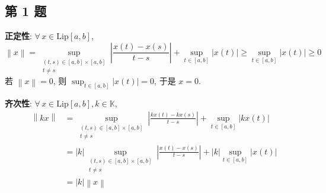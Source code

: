 \documentclass[\ROOT/main.tex]{subfiles}
\begin{document}
\subsection{第 1 题}
\noindent\textbf{正定性}:
$\forall \, x \in \mathrm{Lip} [a, b]$,
\[
    \left\| x \right\|
    =
    \sup_{\substack{\left( t, s \right) \in [a, b] \times [a, b] \\ t \neq s}} \left| \frac{x \left( t \right) - x \left( s \right)}{t - s} \right| + \sup_{t \in [a, b]} \left| x \left( t \right) \right|
    \geqslant
    \sup_{t \in [a, b]} \left| x \left( t \right) \right|
    \geqslant
    0
\]
若 $\left\| x \right\| = 0$, 则 $\sup_{t \in [a, b]} \left| x \left( t \right) \right| = 0$, 于是 $x = 0$.

\noindent\textbf{齐次性}:
$\forall \, x \in \mathrm{Lip} [a, b], k \in \mathbb{K}$,
\begin{align*}
    \left\| k x \right\|
    &=
    \sup_{\substack{\left( t, s \right) \in [a, b] \times [a, b] \\ t \neq s}} \left| \frac{k x \left( t \right) - k x \left( s \right)}{t - s} \right| + \sup_{t \in [a, b]} \left| k x \left( t \right) \right| \\
    &=
    \left| k \right| \sup_{\substack{\left( t, s \right) \in [a, b] \times [a, b] \\ t \neq s}} \left| \frac{x \left( t \right) - x \left( s \right)}{t - s} \right| + \left| k \right| \sup_{t \in [a, b]} \left| x \left( t \right) \right| \\
    &=
    \left| k \right| \left\| x \right\|
\end{align*}
\end{document}
